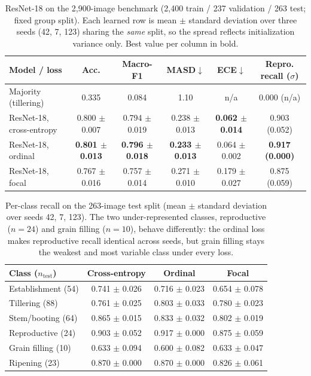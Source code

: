 \documentclass{llncs}
\begin{document}
\begin{table}[t]
\centering
\caption{ResNet-18 on the 2{,}900-image benchmark (2{,}400 train / 237 validation / 263 test; fixed group split). Each learned row is mean $\pm$ standard deviation over three seeds (42, 7, 123) sharing the \emph{same} split, so the spread reflects initialization variance only. Best value per column in bold.}
\label{tab:results}
\small
\begin{tabular}{lccccc}
\toprule
\textbf{Model / loss} & \textbf{Acc.} & \textbf{Macro-F1} & \textbf{MASD}$\downarrow$ & \textbf{ECE}$\downarrow$ & \textbf{Repro. recall ($\sigma$)} \\
\midrule
Majority (tillering) & 0.335 & 0.084 & 1.10 & n/a & 0.000 (n/a) \\
ResNet-18, cross-entropy & 0.800 $\pm$ 0.007 & 0.794 $\pm$ 0.019 & 0.238 $\pm$ 0.013 & \textbf{0.062 $\pm$ 0.014} & 0.903 (0.052) \\
ResNet-18, ordinal & \textbf{0.801 $\pm$ 0.013} & \textbf{0.796 $\pm$ 0.018} & \textbf{0.233 $\pm$ 0.013} & 0.064 $\pm$ 0.002 & \textbf{0.917 (0.000)} \\
ResNet-18, focal & 0.767 $\pm$ 0.016 & 0.757 $\pm$ 0.014 & 0.271 $\pm$ 0.010 & 0.179 $\pm$ 0.027 & 0.875 (0.059) \\
\bottomrule
\end{tabular}
\end{table}

\begin{table}[t]
\centering
\caption{Per-class recall on the 263-image test split (mean $\pm$ standard deviation over seeds 42, 7, 123). The two under-represented classes, reproductive ($n{=}24$) and grain filling ($n{=}10$), behave differently: the ordinal loss makes reproductive recall identical across seeds, but grain filling stays the weakest and most variable class under every loss.}
\label{tab:perclass}
\small
\begin{tabular}{lccc}
\toprule
\textbf{Class ($n_{\text{test}}$)} & \textbf{Cross-entropy} & \textbf{Ordinal} & \textbf{Focal} \\
\midrule
Establishment (54) & 0.741 $\pm$ 0.026 & 0.716 $\pm$ 0.023 & 0.654 $\pm$ 0.078 \\
Tillering (88) & 0.761 $\pm$ 0.025 & 0.803 $\pm$ 0.033 & 0.780 $\pm$ 0.023 \\
Stem/booting (64) & 0.865 $\pm$ 0.015 & 0.833 $\pm$ 0.032 & 0.802 $\pm$ 0.019 \\
Reproductive (24) & 0.903 $\pm$ 0.052 & 0.917 $\pm$ 0.000 & 0.875 $\pm$ 0.059 \\
Grain filling (10) & 0.633 $\pm$ 0.094 & 0.600 $\pm$ 0.082 & 0.633 $\pm$ 0.047 \\
Ripening (23) & 0.870 $\pm$ 0.000 & 0.870 $\pm$ 0.000 & 0.826 $\pm$ 0.061 \\
\bottomrule
\end{tabular}
\end{table}
\end{document}
